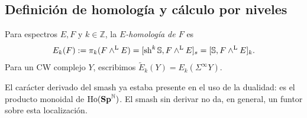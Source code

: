 \subsection{Definición de homología y cálculo por niveles}
\begin{defi}\label{defi:c19-homologia}
Para espectros $E,F$ y $k\in\mathbb Z$, la \emph{$E$-homología de $F$} es
\[
E_k(F):=\pi_k(F\wedge^{\mathrm L}E)
=[\operatorname{sh}^k\mathbb S,F\wedge^{\mathrm L}E]_s
=[\mathbb S,F\wedge^{\mathrm L}E]_k.
\]
Para un CW complejo $Y$, escribimos
$\widetilde E_k(Y)=E_k(\Sigma^\infty Y)$.
\end{defi}
El carácter derivado del smash ya estaba presente en el uso de la dualidad: es el producto monoidal de $\operatorname{Ho}(\mathbf{Sp}^{\mathbb N})$. El smash sin derivar no da, en general, un funtor sobre esta localización.

